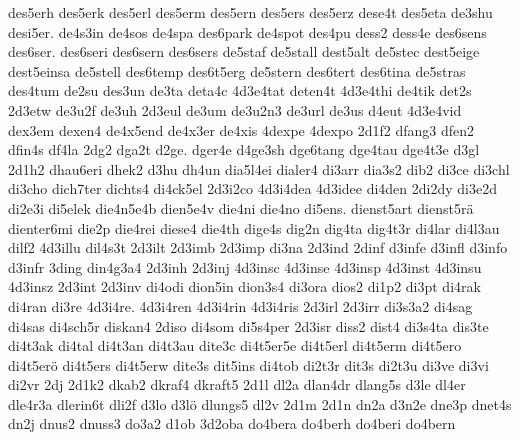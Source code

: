 {    des5erh
    des5erk
    des5erl
    des5erm
    des5ern
    des5ers
    des5erz
    dese4t
    des5eta
    de3shu
    desi5er.
    de4s3in
    de4sos
    de4spa
    des6park
    de4spot
    des4pu
    dess2
    dess4e
    des6sens
    des6ser.
    des6seri
    des6sern
    des6sers
    de5staf
    de5stall
    dest5alt
    de5stec
    dest5eige
    dest5einsa
    de5stell
    des6temp
    des6t5erg
    de5stern
    des6tert
    des6tina
    de5stras
    des4tum
    de2su
    des3un
    de3ta
    deta4c
    4d3e4tat
    deten4t
    4d3e4thi
    de4tik
    det2s
    2d3etw
    de3u2f
    de3uh
    2d3eul
    de3um
    de3u2n3
    de3url
    de3us
    d4eut
    4d3e4vid
    dex3em
    dexen4
    de4x5end
    de4x3er
    de4xis
    4dexpe
    4dexpo
    2d1f2
    dfang3
    dfen2
    dfin4s
    df4la
    2dg2
    dga2t
    d2ge.
    dger4e
    d4ge3sh
    dge6tang
    dge4tau
    dge4t3e
    d3gl
    2d1h2
    dhau6eri
    dhek2
    d3hu
    dh4un
    dia5l4ei
    dialer4
    di3arr
    dia3s2
    dib2
    di3ce
    di3chl
    di3cho
    dich7ter
    dichts4
    di4ck5el
    2d3i2co
    4d3i4dea
    4d3idee
    di4den
    2di2dy
    di3e2d
    di2e3i
    di5elek
    die4n5e4b
    dien5e4v
    die4ni
    die4no
    di5ens.
    dienst5art
    dienst5rä
    dienter6mi
    die2p
    die4rei
    diese4
    die4th
    dige4s
    dig2n
    dig4ta
    dig4t3r
    di4lar
    di4l3au
    dilf2
    4d3illu
    dil4s3t
    2d3ilt
    2d3imb
    2d3imp
    di3na
    2d3ind
    2dinf
    d3infe
    d3infl
    d3info
    d3infr
    3ding
    din4g3a4
    2d3inh
    2d3inj
    4d3insc
    4d3inse
    4d3insp
    4d3inst
    4d3insu
    4d3insz
    2d3int
    2d3inv
    di4odi
    dion5in
    dion3s4
    di3ora
    dios2
    di1p2
    di3pt
    di4rak
    di4ran
    di3re
    4d3i4re.
    4d3i4ren
    4d3i4rin
    4d3i4ris
    2d3irl
    2d3irr
    di3s3a2
    di4sag
    di4sas
    di4sch5r
    diskan4
    2diso
    di4som
    di5s4per
    2d3isr
    diss2
    dist4
    di3s4ta
    dis3te
    di4t3ak
    di4tal
    di4t3an
    di4t3au
    dite3c
    di4t5er5e
    di4t5erl
    di4t5erm
    di4t5ero
    di4t5erö
    di4t5ers
    di4t5erw
    dite3s
    dit5ins
    di4tob
    di2t3r
    dit3s
    di2t3u
    di3ve
    di3vi
    di2vr
    2dj
    2d1k2
    dkab2
    dkraf4
    dkraft5
    2d1l
    dl2a
    dlan4dr
    dlang5s
    d3le
    dl4er
    dle4r3a
    dlerin6t
    dli2f
    d3lo
    d3lö
    dlungs5
    dl2v
    2d1m
    2d1n
    dn2a
    d3n2e
    dne3p
    dnet4s
    dn2j
    dnus2
    dnuss3
    do3a2
    d1ob
    3d2oba
    do4bera
    do4berh
    do4beri
    do4bern
}
